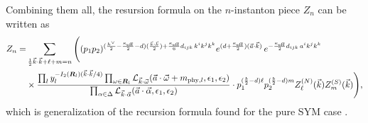\documentclass[letterpaper, 11pt]{article}
\newcommand{\nn}{\nonumber}
\def\CL{{\cal L}}
\def\a{\alpha}
\def\e{\epsilon}
\def\k{\kappa}
\def\w{\omega}
\def\D{\Delta}
\begin{document}
Combining them all, the resursion formula on the $n$-instanton piece $Z_n$ can be written as
\begin{align}
  \label{eq:recursion}
  Z_n = &\sum_{\frac{1}{2}\vec{k}\cdot\vec{k} + \ell + m = n}  
  \Bigg( (p_1p_2)^{(\frac{h^\vee}{2} - \frac{\kappa_\text{eff}}{2}-d) (\frac{\vec{k}\cdot\vec{k}}{2}) +\frac{\k_\text{eff}}{6}d_{ijk}\,k^ik^jk^k} e^{(d+\frac{\k_\text{eff}}{2})(\vec{a}\cdot\vec{k})}\,
 e^{-\frac{\k_\text{eff}}{2}d_{ijk}\,a^ik^jk^k} \\& 
 \times    \frac{\prod_{l} y_l^{-I_2(\boldsymbol{R}_l)(\vec{k}\cdot\vec{k}/4)} \prod_{\w \in \boldsymbol{R}_l} \CL_{\vec{k}\cdot\vec{\w}}(\vec{a}\cdot \vec{\w} + m_{\text{phy},l}, \e_1,\e_2)}{ \prod_{\a \in \D} \CL_{\vec{k} \cdot \vec{\a}} (\vec{a}\cdot\vec{\alpha}, \epsilon_1, \epsilon_2)}
 \cdot p_1^{(\frac{b}{2}-d)\ell}p_2^{(\frac{b}{2}-d)m}Z^{(N)}_{\ell}(\vec{k})  Z^{(S)}_m (\vec{k}) \Bigg) \nn,
 \end{align}
 which is generalization of the recursion formula found for the pure SYM case \cite{Nakajima:2005fg,Gottsche:2006bm}. 
\end{document}
